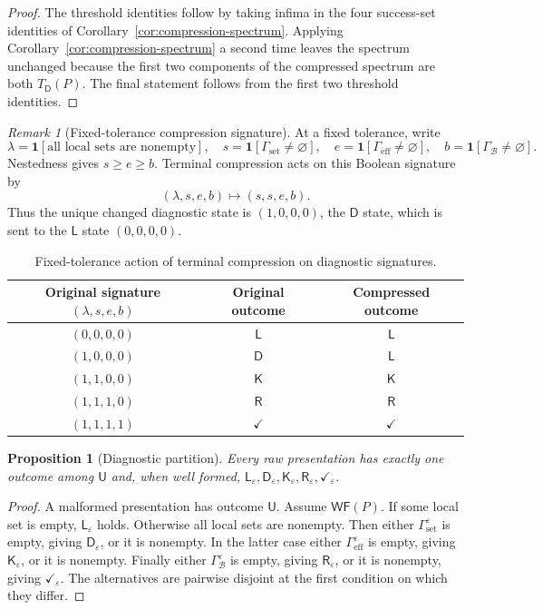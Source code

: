 \documentclass[11pt]{article}
\theoremstyle{plain}
\newtheorem{proposition}[theorem]{Proposition}
\theoremstyle{definition}
\theoremstyle{remark}
\newtheorem{remark}[theorem]{Remark}
\newcommand{\eps}{\varepsilon}
\begin{document}
\begin{proof}
The threshold identities follow by taking infima in the four success-set
identities of Corollary~\ref{cor:compression-spectrum}. Applying
Corollary~\ref{cor:compression-spectrum} a second time leaves the spectrum
unchanged because the first two components of the compressed spectrum are both
$T_{\mathsf D}(P)$. The final statement follows from the first two threshold
identities.
\end{proof}

\begin{remark}[Fixed-tolerance compression signature]
At a fixed tolerance, write
\[
\lambda=\mathbf 1[\text{all local sets are nonempty}],\quad
s=\mathbf 1[\Gamma_{\mathrm{set}}\ne\varnothing],\quad
e=\mathbf 1[\Gamma_{\mathrm{eff}}\ne\varnothing],\quad
b=\mathbf 1[\Gamma_{\mathcal B}\ne\varnothing].
\]
Nestedness gives $s\ge e\ge b$. Terminal compression acts on this Boolean
signature by
\[
(\lambda,s,e,b)\longmapsto(s,s,e,b).
\]
Thus the unique changed diagnostic state is
$(1,0,0,0)$, the $\mathsf D$ state, which is sent to the $\mathsf L$ state
$(0,0,0,0)$.
\end{remark}

\begin{table}[htbp]
\centering
\caption{Fixed-tolerance action of terminal compression on diagnostic signatures.}
\label{tab:compression-signature}
\begin{tabular}{@{}c c c@{}}
\toprule
Original signature $(\lambda,s,e,b)$ & Original outcome & Compressed outcome\\
\midrule
$(0,0,0,0)$ & $\mathsf L$ & $\mathsf L$\\
$(1,0,0,0)$ & $\mathsf D$ & $\mathsf L$\\
$(1,1,0,0)$ & $\mathsf K$ & $\mathsf K$\\
$(1,1,1,0)$ & $\mathsf R$ & $\mathsf R$\\
$(1,1,1,1)$ & $\checkmark$ & $\checkmark$\\
\bottomrule
\end{tabular}
\end{table}

\begin{proposition}[Diagnostic partition]\label{prop:diagnostic}
Every raw presentation has exactly one outcome among
$\mathsf U$ and, when well formed,
$\mathsf L_\eps,\mathsf D_\eps,\mathsf K_\eps,
\mathsf R_\eps,\checkmark_\eps$.
\end{proposition}

\begin{proof}
A malformed presentation has outcome $\mathsf U$. Assume $\mathsf{WF}(P)$.
If some local set is empty, $\mathsf L_\eps$ holds. Otherwise all local sets are
nonempty. Then either $\Gamma_{\mathrm{set}}^\eps$ is empty, giving
$\mathsf D_\eps$, or it is nonempty. In the latter case either
$\Gamma_{\mathrm{eff}}^\eps$ is empty, giving $\mathsf K_\eps$, or it is
nonempty. Finally either $\Gamma_{\mathcal B}^\eps$ is empty, giving
$\mathsf R_\eps$, or it is nonempty, giving $\checkmark_\eps$. The alternatives
are pairwise disjoint at the first condition on which they differ.
\end{proof}
\end{document}
